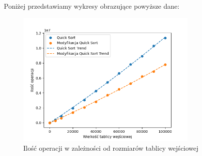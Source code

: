 \documentclass{article}
\begin{document}
\begin{table}[H]
    \centering
    \caption{Liczba operacji i czas wykonania dla modyfikacji algorytmu \texttt{Quick Sort} przy różnych rozmiarach tablicy w pesymistycznym przypadku}
    \label{tab:quicksortp_results}
\end{table}
Poniżej przedstawiamy wykresy obrazujące powyższe dane:
\begin{figure}[H]
    \centering
    \includegraphics[width=0.8\textwidth]{Figure_1.png}
    \caption{Ilość operacji w zależności od rozmiarów tablicy wejściowej}
    \label{fig:quicksort}
\end{figure}
\end{document}

